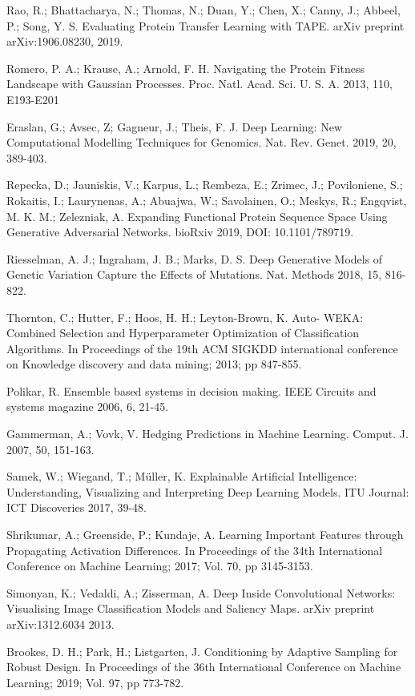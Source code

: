 \documentclass[12pt]{article}
\begin{document}
\begin{thebibliography}{20}
 Rao, R.; Bhattacharya, N.; Thomas, N.; Duan, Y.; Chen, X.; Canny, J.; Abbeel, P.; Song, Y. S. Evaluating Protein Transfer Learning with TAPE. arXiv preprint arXiv:1906.08230, 2019.


 Romero, P. A.; Krause, A.; Arnold, F. H. Navigating the Protein Fitness Landscape with Gaussian Processes. Proc. Natl. Acad. Sci. U. S. A. 2013, 110, E193-E201

 Eraslan, G.; Avsec, Z; Gagneur, J.; Theis, F. J. Deep Learning: New Computational Modelling Techniques for Genomics. Nat. Rev. Genet. 2019, 20, 389-403.

 Repecka, D.; Jauniskis, V.; Karpus, L.; Rembeza, E.; Zrimec, J.; Poviloniene, S.; Rokaitis, I.; Laurynenas, A.; Abuajwa, W.; Savolainen, O.; Meskys, R.; Engqvist, M. K. M.; Zelezniak, A. Expanding Functional Protein Sequence Space Using Generative Adversarial Networks. bioRxiv 2019, DOI: 10.1101/789719.

 Riesselman, A. J.; Ingraham, J. B.; Marks, D. S. Deep Generative Models of Genetic Variation Capture the Effects of Mutations. Nat. Methods 2018, 15, 816-822.

 Thornton, C.; Hutter, F.; Hoos, H. H.; Leyton-Brown, K. Auto- WEKA: Combined Selection and Hyperparameter Optimization of Classiﬁcation Algorithms. In Proceedings of the 19th ACM SIGKDD international conference on Knowledge discovery and data mining; 2013; pp 847-855.

 Polikar, R. Ensemble based systems in decision making. IEEE Circuits and systems magazine 2006, 6, 21-45.

 Gammerman, A.; Vovk, V. Hedging Predictions in Machine Learning. Comput. J. 2007, 50, 151-163.

 Samek, W.; Wiegand, T.; Müller, K. Explainable Artificial Intelligence: Understanding, Visualizing and Interpreting Deep Learning Models. ITU Journal: ICT Discoveries 2017, 39-48. 

 Shrikumar, A.; Greenside, P.; Kundaje, A. Learning Important Features through Propagating Activation Diﬀerences. In Proceedings of the 34th International Conference on Machine Learning; 2017; Vol. 70, pp 3145-3153.

 Simonyan, K.; Vedaldi, A.; Zisserman, A. Deep Inside Convolutional Networks: Visualising Image Classiﬁcation Models and Saliency Maps. arXiv preprint arXiv:1312.6034 2013.

 Brookes, D. H.; Park, H.; Listgarten, J. Conditioning by Adaptive Sampling for Robust Design. In Proceedings of the 36th International Conference on Machine Learning; 2019; Vol. 97, pp 773-782.


\end{thebibliography}
\end{document}
